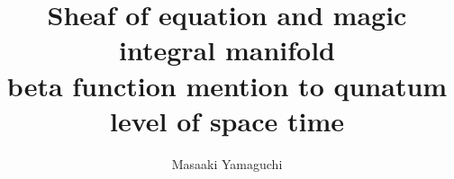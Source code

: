 \documentclass{jsarticle}
\begin{document}
\title{Sheaf of equation and magic integral manifold \\
beta function mention to qunatum level of space time}
\author{Masaaki Yamaguchi}
\date{}
\maketitle
   \newcommand{\variint}{%
	\begin{picture}(15,30)
		\put(0,0){
			$ \iint $}
		\put(0,5){\line(15,0){15}}
	\end{picture} %
}

\newcommand{\variiint}{%
	\begin{picture}(20,20)
		\put(0,0){
			$ \iiint $}
		\put(0,5){\line(15,0){20}}
	\end{picture} %
}



 \newcommand{\alearletter}{%
	 \begin{picture}(10,20)
		 \put(0,0){
			 $ \square $}
		 \put(0,0){\line(1,1){10}}
	 \end{picture} %
	 }

 \newcommand{\secproduct}{%
	 \begin{picture}(10,20)
		 \put(0,0){
			 $ \nabla $}
		 \put(5,0){+}
	 \end{picture} %
	 }
 \newcommand{\talot}{%
	 \begin{picture}(15,20)
		 \put(0,0){
			 $ \text{\scalebox{2.0}[2]{$\nabla$}}$}
		 \put(5,3){
			 $ \Delta $}
	 \end{picture} %
	 }
 \newcommand{\hazerdnabla}{%
	 \begin{picture}(15,20)
		 \put(0,0){
			 $ \text{\scalebox{2.0}[2]{$\nabla$}}$}
		 \put(5,3){
			 $\text{Y}  $}
	 \end{picture} %
	 }


\newcommand{\timebow}{%
	\begin{picture}(5,5)
		\put(0,0){$\text{\rotatebox{90}{$\bowtie$}}$}
	\end{picture} %
	}


 \newcommand{\flowerletter}{%
	 \begin{picture}(10,20)
		 \put(0,0){$\text{\scalebox{1.0}[1]{$\square$}}$}
		 \put(0,0){$\text{\scalebox{1.0}[2]{$\int$}}$}
	 \end{picture} %
	 }
\newcommand{\squareiint}{%
	\begin{picture}(15,30)
		\put(0,0){
			$ \iint $}
		\put(0,5){$\text{\scalebox{2.0}[1]{$\square$}}$}
	\end{picture} %
}
\end{document}
